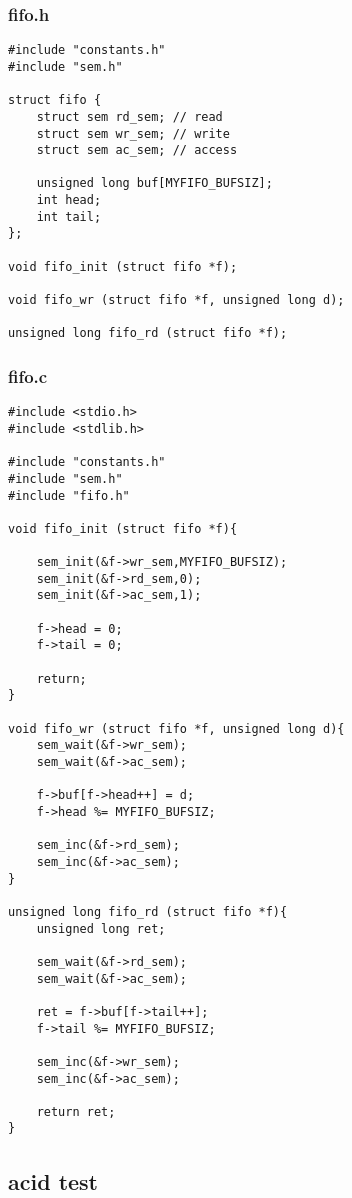 \documentclass[12pt]{article}
\begin{document}
    \subsubsection{fifo.h}
    \begin{lstlisting}
#include "constants.h"
#include "sem.h"

struct fifo {
    struct sem rd_sem; // read
    struct sem wr_sem; // write
    struct sem ac_sem; // access

    unsigned long buf[MYFIFO_BUFSIZ];
    int head;
    int tail;
};

void fifo_init (struct fifo *f);

void fifo_wr (struct fifo *f, unsigned long d);

unsigned long fifo_rd (struct fifo *f);
    \end{lstlisting}

    \subsubsection{fifo.c}
    \begin{lstlisting}
#include <stdio.h>
#include <stdlib.h>

#include "constants.h"
#include "sem.h"
#include "fifo.h"

void fifo_init (struct fifo *f){

    sem_init(&f->wr_sem,MYFIFO_BUFSIZ);
    sem_init(&f->rd_sem,0);
    sem_init(&f->ac_sem,1);

    f->head = 0;
    f->tail = 0;

    return;
}

void fifo_wr (struct fifo *f, unsigned long d){
    sem_wait(&f->wr_sem);
    sem_wait(&f->ac_sem);

    f->buf[f->head++] = d;
    f->head %= MYFIFO_BUFSIZ;

    sem_inc(&f->rd_sem);
    sem_inc(&f->ac_sem);
}

unsigned long fifo_rd (struct fifo *f){
    unsigned long ret;

    sem_wait(&f->rd_sem);
    sem_wait(&f->ac_sem);

    ret = f->buf[f->tail++];
    f->tail %= MYFIFO_BUFSIZ;

    sem_inc(&f->wr_sem);
    sem_inc(&f->ac_sem);

    return ret;
}
    \end{lstlisting}

\subsection{acid test}
\end{document}
